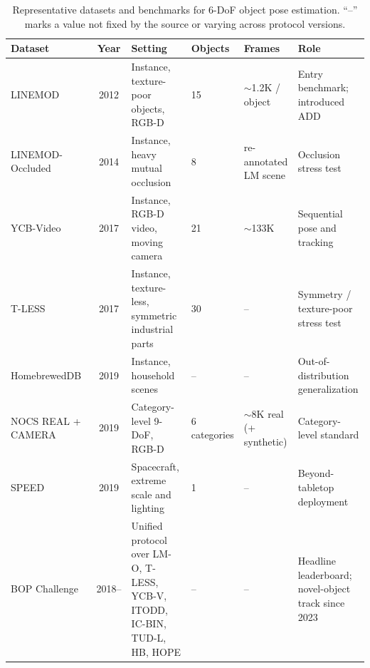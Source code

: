 \begin{table}[!t]
    \centering
    \caption{Representative datasets and benchmarks for 6-DoF object pose estimation. ``--'' marks a value not fixed by the source or varying across protocol versions.}
    \label{tab:pose_datasets}
    \fontsize{9}{11}\selectfont
    \setlength{\tabcolsep}{1.2mm}
    \begin{tabular}{L{0.20\textwidth} c L{0.23\textwidth} C{0.09\textwidth} C{0.13\textwidth} L{0.19\textwidth}}
    \toprule
    \textbf{Dataset} & \textbf{Year} & \textbf{Setting} & \textbf{Objects} & \textbf{Frames} & \textbf{Role} \\
    \midrule
    LINEMOD~\cite{hinterstoisser2012linemod} & 2012 & Instance, texture-poor objects, RGB-D & 15 & $\sim$1.2K / object & Entry benchmark; introduced ADD \\
    LINEMOD-Occluded~\cite{brachmann2014lmo} & 2014 & Instance, heavy mutual occlusion & 8 & re-annotated LM scene & Occlusion stress test \\
    YCB-Video~\cite{xiang2017posecnn} & 2017 & Instance, RGB-D video, moving camera & 21 & $\sim$133K & Sequential pose and tracking \\
    T-LESS~\cite{Hodan2017TLESS} & 2017 & Instance, texture-less, symmetric industrial parts & 30 & -- & Symmetry / texture-poor stress test \\
    HomebrewedDB~\cite{kaskman2019hbdb} & 2019 & Instance, household scenes & -- & -- & Out-of-distribution generalization \\
    NOCS REAL + CAMERA~\cite{Wang0HVSG19} & 2019 & Category-level 9-DoF, RGB-D & 6 categories & $\sim$8K real (+ synthetic) & Category-level standard \\
    SPEED~\cite{Sharma2019SpacecraftPE} & 2019 & Spacecraft, extreme scale and lighting & 1 & -- & Beyond-tabletop deployment \\
    BOP Challenge~\cite{hodan2018bop,hodan2020bop,sundermeyer2023bop} & 2018-- & Unified protocol over LM-O, T-LESS, YCB-V, ITODD, IC-BIN, TUD-L, HB, HOPE & -- & -- & Headline leaderboard; novel-object track since 2023 \\
    \bottomrule
    \end{tabular}
\end{table}

